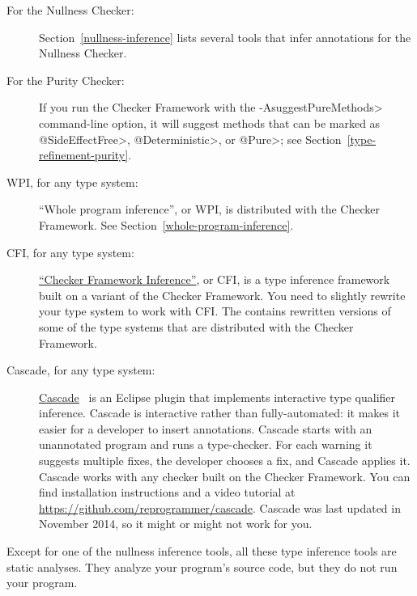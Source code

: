 \begin{description}
  \item[For the Nullness Checker:]
Section~\ref{nullness-inference} lists several tools that infer
annotations for the Nullness Checker.

\item[For the Purity Checker:]
If you run the Checker Framework with the \<-AsuggestPureMethods>
command-line option, it will suggest methods that can be marked as
\<@SideEffectFree>, \<@Deterministic>, or \<@Pure>; see
Section~\ref{type-refinement-purity}.

\item[WPI, for any type system:]
``Whole program inference'', or WPI, is distributed with the Checker
  Framework.  See Section~\ref{whole-program-inference}.

\item[CFI, for any type system:]
\href{https://github.com/opprop/checker-framework-inference}{``Checker
  Framework Inference''}, or CFI, is a type inference framework built on
a variant of the Checker Framework.  You need to slightly rewrite your type system to
work with CFI\@.  The
 contains rewritten versions of some of
the type systems that are distributed with the Checker Framework.

\item[Cascade, for any type system:]
\href{https://github.com/reprogrammer/cascade/}{Cascade}~\cite{VakilianPEJ2014}
is an Eclipse plugin that implements interactive type qualifier inference.
Cascade is interactive rather than fully-automated:  it makes it easier for
a developer to insert annotations.
Cascade starts with an unannotated program and runs a type-checker.  For each
warning it suggests multiple fixes, the developer chooses a fix, and
Cascade applies it.  Cascade works with any checker built on the Checker
Framework.
You can find installation instructions and a video tutorial at \url{https://github.com/reprogrammer/cascade}.
Cascade was last updated in November 2014, so it might or might not work for you.

\end{description}

Except for one of the nullness inference tools, all these
type inference tools are static analyses.  They analyze your program's
source code, but they do not run your program.


